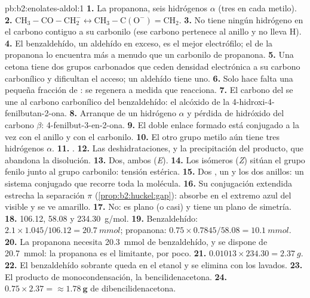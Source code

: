 \begin{solution}{pb:b2:enolates-aldol:1}
\textbf{1.} La propanona, seis hidrógenos $\alpha$ (tres en cada metilo).
\textbf{2.} $\mathrm{CH_3{-}CO{-}CH_2^-} \leftrightarrow \mathrm{CH_3{-}C(O^-){=}CH_2}$.
\textbf{3.} No tiene ningún hidrógeno en el carbono contiguo a su carbonilo (ese carbono pertenece al anillo y
no lleva H).
\textbf{4.} El benzaldehído, un aldehído en exceso, es el mejor electrófilo; el  de la propanona lo encuentra
más a menudo que un carbonilo de propanona.
\textbf{5.} Una cetona tiene dos grupos carbonados que ceden densidad electrónica a su carbono carbonílico y
dificultan el acceso; un aldehído tiene uno.
\textbf{6.} Solo hace falta una pequeña fracción de : se regenera a medida que reacciona.
\textbf{7.} El carbono del  se une al carbono carbonílico del benzaldehído: el alcóxido de la
4-hidroxi-4-fenilbutan-2-ona.
\textbf{8.} Arranque de un hidrógeno $\alpha$ y pérdida de hidróxido del carbono $\beta$: 4-fenilbut-3-en-2-ona.
\textbf{9.} El doble enlace formado está conjugado a la vez con el anillo y con el carbonilo.
\textbf{10.} El otro grupo metilo aún tiene tres hidrógenos $\alpha$.
\textbf{11.} .
\textbf{12.} Las deshidrataciones, y la precipitación del producto, que abandona la disolución.
\textbf{13.} Dos, ambos (\textit{E}).
\textbf{14.} Los isómeros (\textit{Z}) sitúan el grupo fenilo junto al grupo carbonilo: tensión estérica.
\textbf{15.} Dos , un  y los dos anillos: un sistema conjugado que recorre toda la molécula.
\textbf{16.} Su conjugación extendida estrecha la separación $\pi$ (\cref{prop:b2:huckel:gap}): absorbe en el
extremo azul del visible y se ve amarillo.
\textbf{17.} No: es plano (o casi) y tiene un plano de simetría.
\textbf{18.} 106.12, 58.08 y \qty{234.30}{g/mol}.
\textbf{19.} Benzaldehído: $2.1 \times 1.045/106.12 = \qty{20.7}{mmol}$; propanona: $0.75 \times
0.7845/58.08 = \qty{10.1}{mmol}$.
\textbf{20.} La propanona necesita \qty{20.3}{mmol} de benzaldehído, y se dispone de \qty{20.7}{mmol}:
la propanona es el limitante, por poco.
\textbf{21.} $0.01013 \times 234.30 = \qty{2.37}{g}$.
\textbf{22.} El benzaldehído sobrante queda en el etanol y se elimina con los lavados.
\textbf{23.} El producto de monocondensación, la bencilidenacetona.
\textbf{24.} $0.75 \times 2.37 = \boldsymbol{\approx \qty{1.78}{g}}$ de dibencilidenacetona.
\end{solution}
